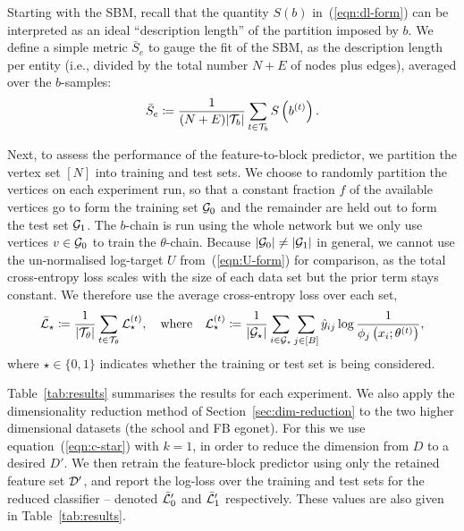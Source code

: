 Starting with the SBM, recall that the quantity $S(b)$ in~(\ref{eqn:dl-form}) 
can be interpreted as an ideal ``description length'' of the partition 
imposed by $b$. We define a simple
metric $\bar{S}_e$ to gauge the fit of the SBM,
as the description length per entity 
(i.e., divided by the total number $N+E$ of 
nodes plus edges),
averaged over the $b$-samples:
%
\begin{equation}
	\bar{S}_e \coloneqq \frac{1}{(N+E) |\mathcal{T}_b|} \sum_{t\in \mathcal{T}_b} S \left( b^{(t)} \right).
	\label{eqn:mean-dl}
\end{equation}
%

Next, to assess the performance of the feature-to-block predictor, 
we partition the vertex set $[N]$ into training and test sets. We choose to 
randomly partition the vertices on each experiment run,
so that a constant fraction $f$ of the available vertices go to form 
the training set $\mathcal{G}_0$ and the remainder are held out to form the
test set $\mathcal{G}_1$.
The $b$-chain is run using the whole network but we only use vertices $v \in \mathcal{G}_0$ to train the $\theta$-chain. Because $|\mathcal{G}_0| \neq |\mathcal{G}_1|$ in general, we cannot use the un-normalised log-target $U$ from~(\ref{eqn:U-form}) for comparison,
as the total cross-entropy loss scales with the size of each data set but 
the prior term stays constant. We therefore use the average cross-entropy loss 
over each set,
%
\begin{equation}
	\bar{\mathcal{L}}_\star \coloneqq \frac{1}{|\mathcal{T}_\theta|} \sum_{t \in \mathcal{T}_\theta} \mathcal{L}_\star^{(t)},
	\quad \textrm{where} \quad
	\mathcal{L}_\star^{(t)} \coloneqq \frac{1}{|\mathcal{G}_\star|} \sum_{i \in \mathcal{G}_\star}\sum_{j \in [B]} \hat{y}_{ij} \log \frac{1}{\phi_j \left(x_i; \theta^{(t)} \right)},
	\label{eqn:cross-entropy-loss}
\end{equation}
%
where $\star \in \{0, 1\}$ indicates whether the training or test
set is being considered.

Table~\ref{tab:results} summarises the results for each experiment. We also apply the 
dimensionality reduction method 
of Section~\ref{sec:dim-reduction}
to the two higher dimensional datasets (the school and FB egonet). 
For this we use equation~(\ref{eqn:c-star}) with $k=1$,
in order to reduce the dimension from 
$D$ to a desired $D'$. 
We then retrain the feature-block predictor using only the retained 
feature set $\mathcal{D}'$, and report the log-loss over the training and 
test sets for the reduced classifier -- 
denoted $\bar{\mathcal{L}}_0'$ and $\bar{\mathcal{L}}_1'$ respectively. 
These values are also given in Table~\ref{tab:results}.

